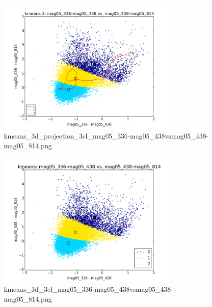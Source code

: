 \documentclass{article}%
\begin{document}
\begin{figure}%
\centering%
\includegraphics[width=0.8\textwidth]{kmeans_3d_projection_3cl_mag05_336-mag05_438vsmag05_438-mag05_814.png}%
\caption{kmeans\_3d\_projection\_3cl\_mag05\_336{-}mag05\_438vsmag05\_438{-}mag05\_814.png}%
\end{figure}

%


\begin{figure}%
\centering%
\includegraphics[width=0.8\textwidth]{kmeans_3d_3cl_mag05_336-mag05_438vsmag05_438-mag05_814.png}%
\caption{kmeans\_3d\_3cl\_mag05\_336{-}mag05\_438vsmag05\_438{-}mag05\_814.png}%
\end{figure}

%
\end{document}
